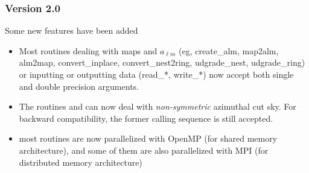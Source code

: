 \documentclass[12pt,twoside]{article}
\newcommand{\compresslist}{%
\setlength{\itemsep}{0ex}}{}
\begin{document}
{\begin{itemize}
\end{itemize}

\subsubsection*{Version 2.0}
Some new features have been added
\begin{itemize}\compresslist
\item Most routines dealing with maps and $a_{\ell m}$ (eg, create\_alm, map2alm, alm2map,
  convert\_inplace, convert\_nest2ring, udgrade\_nest, udgrade\_ring) or inputting or outputting  data (read\_*, write\_*)
 now accept both single and double precision arguments.
\item The routines  and   can now deal with
  {\em non-symmetric} azimuthal cut sky. For backward compatibility, the former calling sequence
  is still accepted.
\item most routines are now parallelized with OpenMP (for shared memory architecture), and some of them are
also parallelized with MPI (for distributed memory architecture)
\end{itemize}


}
\end{document}
